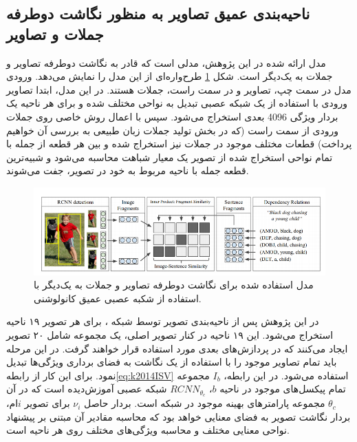 \subsection[ناحیه‌بندی عمیق تصاویر به منظور نگاشت دوطرفه جملات و تصاویر]{ناحیه‌بندی عمیق تصاویر به منظور نگاشت دوطرفه جملات و تصاویر\cite{karpathy2014deep}}

مدل ارائه شده در این پژوهش، مدلی است که قادر به نگاشت دوطرفه تصاویر و جملات به یک‌دیگر است. شکل
\ref{fig:k2014DM} 
طرح‌واره‌ای از این مدل را نمایش می‌دهد. ورودی مدل در سمت چپ، تصاویر و در سمت راست، جملات هستند. در این مدل، ابتدا تصاویر ورودی با استفاده از یک شبکه عصبی 
 تبدیل به نواحی مختلف شده و برای هر ناحیه یک بردار ویژگی 4096 بعدی استخراج می‌شود. سپس با اعمال روش خاصی روی جملات ورودی از سمت راست (که در بخش تولید جملات زبان طبیعی به بررسی آن خواهیم پرداخت) قطعات مختلف موجود در جملات نیز استخراج شده و بین هر قطعه از جمله با تمام نواحی استخراج شده از تصویر یک معیار شباهت محاسبه می‌شود و شبیه‌ترین قطعه جمله با ناحیه مربوط به خود در تصویر، جفت می‌شوند.

\begin{figure}[h]
	\center
	\includegraphics[scale=0.5]{./Imgs/karpathy2014deep_model.png}
	\caption[طرح‌واره عملکرد روش ]{مدل استفاده شده برای نگاشت دو‌طرفه تصاویر و جملات به یک‌دیگر با استفاده از شکبه‌ عصبی عمیق کانولوشنی.\cite{karpathy2014deep}}
	\label{fig:k2014DM}
\end{figure}

در این پژوهش پس از ناحیه‌بندی تصویر توسط شبکه ، برای هر تصویر ۱۹ ناحیه استخراج می‌شود. این ۱۹ ناحیه در کنار تصویر اصلی، یک مجموعه شامل ۲۰ تصویر ایجاد می‌کنند که در پردازش‌های بعدی مورد استفاده قرار خواهند گرفت. در این مرحله باید تمام تصاویر موجود را با استفاده از یک نگاشت به فضای برداری ویژگی‌ها تبدیل نمود. برای این کار از رابطه\ref{eq:k2014ISV}
استفاده می‌شود. در این رابطه، $I_b$ مجموعه تمام پیکسل‌های موجود در ناحیه $b$،
$RCNN_{\theta_c}$
شبکه عصبی آموزش‌دیده است که در آن $\theta_c$ مجموعه پارامترهای بهینه موجود در شبکه است. بردار حاصل $\nu_i$ برای تصویر $i$ام، بردار نگاشت تصویر به فضای معنایی خواهد بود که محاسبه مقادیر آن مبتنی بر پیشنهاد نواحی معنایی مختلف و محاسبه ويژگی‌های مختلف روی هر ناحیه است.

